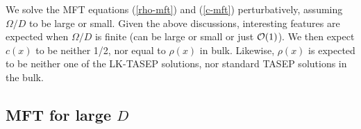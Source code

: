 \documentclass[aps,pre,twocolumn,superscriptaddress,amsmath,amssymb,longbibliography,floatfix,nofootinbib]{revtex4}
\begin{document}
{%

We solve the MFT equations (\ref{rho-mft}) and (\ref{c-mft}) perturbatively, assuming $\Omega/D$ to be large or small.
Given the above discussions, interesting features are expected when $\Omega/D$ is finite (can be large or small or just ${\cal O}(1)$). We then expect $c(x)$ to be neither 1/2, nor equal to $\rho(x)$ in bulk. Likewise, $\rho(x)$ is expected to be neither one of the LK-TASEP solutions, nor standard TASEP solutions in the bulk.  

\subsection{MFT for large $D$}

}
\end{document}

